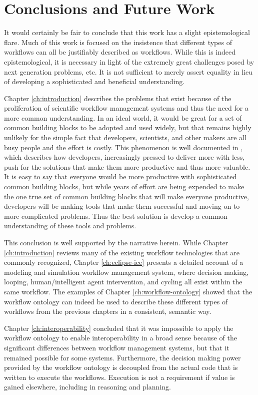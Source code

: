 \chapter{Conclusions and Future Work}\label{ch:conclusions}

It would certainly be fair to conclude that this work has a slight
epistemological flare. Much of this work is focused on the insistence that
different types of workflows can all be justifiably described as workflows.
While this is indeed epistemological, it is necessary in light of the extremely
great challenges posed by next generation problems, etc. It is not sufficient to
merely assert equality in lieu of developing a sophisticated and beneficial
understanding.

Chapter \ref{ch:introduction} describes the problems that exist because of the
proliferation of scientific workflow management systems and thus the need for a
more common understanding. In an ideal world, it would be great for a set of
common building blocks to be adopted and used widely, but that remains highly
unlikely for the simple fact that developers, scientists, and other makers are
all busy people and the effort is costly. This phenomenon is well documented in
\cite{ogrady_new_2013}, which describes how developers, increasingly pressed to
deliver more with less, push for the solutions that make them more productive
and thus more valuable. It is easy to say that everyone would be more productive
with sophisticated common building blocks, but while years of effort are being
expended to make the one true set of common building blocks that will make
everyone productive, developers will be making tools that make them successful
and moving on to more complicated problems. Thus the best solution is develop a
common understanding of these tools and problems.

This conclusion is well supported by the narrative herein. While Chapter
\ref{ch:introduction} reviews many of the existing workflow technologies that
are commonly recognized, Chapter \ref{ch:eclipse-ice} presents a detailed
account of a modeling and simulation workflow management system, where decision
making, looping, human/intelligent agent intervention, and cycling all exist
within the same workflow. The examples of Chapter \ref{ch:workflow-ontology}
showed that the workflow ontology can indeed be used to describe these different
types of workflows from the previous chapters in a consistent, semantic way.

Chapter \ref{ch:interoperability} concluded that it was impossible to apply the
workflow ontology to enable interoperability in a broad sense because of the
significant differences between workflow management systems, but that it
remained possible for some systems. Furthermore, the decision making power
provided by the workflow ontology is decoupled from the actual code that is
written to execute the workflows. Execution is not a requirement if value is
gained elsewhere, including in reasoning and planning.

